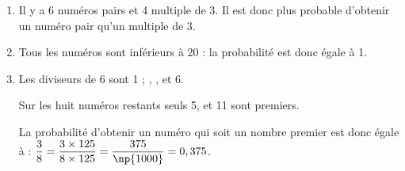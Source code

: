 
\medskip

%

\begin{enumerate}
\item %
Il y a 6 numéros pairs et 4 multiple de 3. Il est donc plus probable d'obtenir un numéro pair qu'un multiple de $3$.
\item %
Tous les numéros sont inférieurs à 20 : la probabilité est donc égale à 1.
\item %

Les diviseurs de 6 sont 1 ; , ,\: et 6.

Sur les huit numéros restants seuls 5,  et  11 sont premiers.

La probabilité d'obtenir un numéro qui soit un nombre premier est donc égale à : $\dfrac{3}{8} = \dfrac{3\times 125}{8 \times 125} = \dfrac{375}{\np{1000}} = 0,375$.
\end{enumerate}

\vspace{0,5cm}


